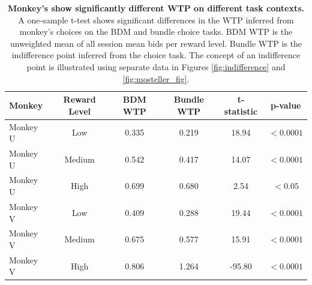 \begin{table}[htbp]
\centering
\begin{tabular}{lccccc}
\hline
\textbf{Monkey} & \textbf{Reward Level} & \textbf{BDM WTP} & \textbf{Bundle WTP} & \textbf{t-statistic} & \textbf{p-value} \\
\hline
Monkey U & Low & 0.335 & 0.219 & 18.94 & $< 0.0001$ \\
Monkey U & Medium & 0.542 & 0.417 & 14.07 & $< 0.0001$ \\
Monkey U & High & 0.699 & 0.680 & 2.54 & $< 0.05$ \\
\hline
Monkey V & Low & 0.409 & 0.288 & 19.44 & $< 0.0001$ \\
Monkey V & Medium & 0.675 & 0.577 & 15.91 & $< 0.0001$ \\
Monkey V & High & 0.806 & 1.264 & -95.80 & $< 0.0001$ \\
\hline
\end{tabular}
\caption[Monkey's show significantly different WTP on different task contexts.]{\textbf{Monkey's show significantly different WTP on different task contexts.} A one-sample t-test shows significant differences in the WTP inferred from monkey's choices on the BDM and bundle choice tasks. BDM WTP is the unweighted mean of all session mean bids per reward level. Bundle WTP is the indifference point inferred from the choice task. The concept of an indifference point is illustrated using separate data in Figures \ref{fig:indifference} and \ref{fig:mosteller_fig}.}
\label{tab:wtp_ttest}
\end{table}

